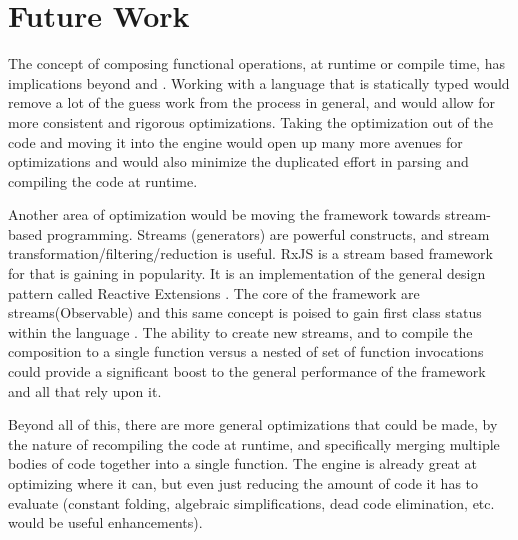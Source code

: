 \section{Future Work}

The concept of composing functional operations, at runtime or compile time, has implications beyond \javascript and \pipelines. Working with a language that is statically typed would remove a lot of the guess work from the process in general, and would allow for more consistent and rigorous optimizations.  Taking the optimization out of the \javascript code and moving it into the engine would open up many more avenues for optimizations and would also minimize the duplicated effort in parsing and compiling the \javascript code at runtime.

Another area of optimization would be moving the framework towards stream-based programming.  Streams (generators) are powerful constructs, and stream transformation/filtering/reduction is useful.  RxJS \cite{rxjs16} is a stream based framework for \javascript that is gaining in popularity. It is an implementation of the general design pattern called Reactive Extensions \cite{rxio16}. The core of the framework are streams(Observable) and this same concept is poised to gain first class status within the \javascript language \cite{observablejs16}. The ability to create new streams, and to compile the composition to a single function versus a nested of set of function invocations could provide a significant boost to the general performance of the framework and all that rely upon it. 

Beyond all of this, there are more general optimizations that could be made, by the nature of recompiling the code at runtime, and specifically merging multiple bodies of code together into a single function.  The \veight \javascript engine is already great at optimizing where it can, but even just reducing the amount of code it has to evaluate (constant folding, algebraic simplifications, dead code elimination, etc. would be useful enhancements).